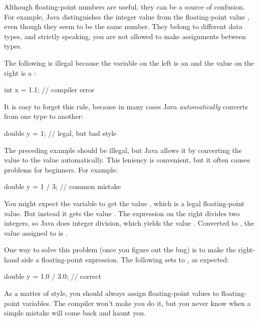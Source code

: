 Although floating-point numbers are useful, they can be a source of confusion.
For example, Java distinguishes the integer value  from the floating-point value , even though they seem to be the same number.
They belong to different data types, and strictly speaking, you are not allowed to make assignments between types.

The following is illegal because the variable on the left is an  and the value on the right is a :

\begin{code}
int x = 1.1;  // compiler error
\end{code}


It is easy to forget this rule, because in many cases Java {\em automatically} converts from one type to another:

\begin{code}
double y = 1;  // legal, but bad style
\end{code}

The preceding example should be illegal, but Java allows it by converting the  value  to the  value  automatically.
This leniency is convenient, but it often causes problems for beginners.
For example:

\begin{code}
double y = 1 / 3;  // common mistake
\end{code}


You might expect the variable  to get the value , which is a legal floating-point value.
But instead it gets the value .
The expression on the right divides two integers, so Java does integer division, which yields the  value .
Converted to , the value assigned to  is .

One way to solve this problem (once you figure out the bug) is to make the right-hand side a floating-point expression.
The following sets  to , as expected:

\begin{code}
double y = 1.0 / 3.0;  // correct
\end{code}

As a matter of style, you should always assign floating-point values to floating-point variables.
The compiler won't make you do it, but you never know when a simple mistake will come back and haunt you.


